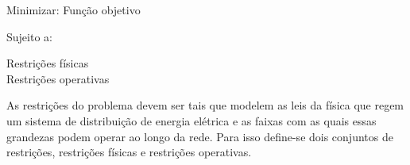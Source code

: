 \begin{tcolorbox}[colback=white!10,title =\textbf{Modelo de um problema de otimização para RDS}]
    \begin{minipage}{\dimexpr\textwidth-\shadowsize-2\fboxrule-2\fboxsep-8pt}
    
    \begin{center}
        Minimizar: Função objetivo        
    \end{center}

    \hspace{2cm}Sujeito a:

    \begin{center}
        Restrições físicas\\
        Restrições operativas\\
    \end{center}
    \end{minipage}
\end{tcolorbox}


As restrições do problema devem ser tais que modelem as leis da física que regem um sistema de distribuição de energia elétrica e as faixas com as quais essas grandezas podem operar ao longo da rede.
Para isso define-se dois conjuntos de restrições, restrições físicas e restrições operativas.